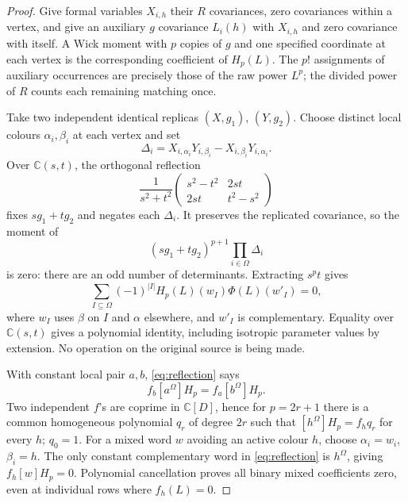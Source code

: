 \documentclass[11pt]{article}
\theoremstyle{definition}
\theoremstyle{plain}
\numberwithin{equation}{section}
\begin{document}
\begin{proof}
Give formal variables \(X_{i,h}\) their \(R\) covariances, zero covariances
within a vertex, and give an auxiliary \(g\) covariance \(L_i(h)\) with
\(X_{i,h}\) and zero covariance with itself. A Wick moment with \(p\) copies
of \(g\) and one specified coordinate at each vertex is the corresponding
coefficient of \(H_p(L)\). The \(p!\) assignments of auxiliary occurrences
are precisely those of the raw power \(L^p\); the divided power of \(R\)
counts each remaining matching once.

Take two independent identical replicas \((X,g_1)\), \((Y,g_2)\). Choose
distinct local colours \(\alpha_i,\beta_i\) at each vertex and set
\[
 \Delta_i=X_{i,\alpha_i}Y_{i,\beta_i}
              -X_{i,\beta_i}Y_{i,\alpha_i}.
\]
Over \(\mathbb C(s,t)\), the orthogonal reflection
\[
 \frac{1}{s^2+t^2}
 \begin{pmatrix}s^2-t^2&2st\\2st&t^2-s^2\end{pmatrix}
\]
fixes \(sg_1+tg_2\) and negates each \(\Delta_i\). It preserves the replicated
covariance, so the moment of
\[
 (sg_1+tg_2)^{p+1}\prod_{i\in\Omega}\Delta_i
\]
is zero: there are an odd number of determinants. Extracting \(s^pt\) gives
\begin{equation}
 \sum_{I\subseteq\Omega}(-1)^{|I|}H_p(L)(w_I)\Phi(L)(w'_I)=0,
 \tag{3}\label{eq:reflection}
\end{equation}
where \(w_I\) uses \(\beta\) on \(I\) and \(\alpha\) elsewhere, and \(w'_I\)
is complementary. Equality over \(\mathbb C(s,t)\) gives a polynomial identity,
including isotropic parameter values by extension. No operation on the
original source is being made.

With constant local pair \(a,b\), \eqref{eq:reflection} says
\[
 f_b[a^\Omega]H_p=f_a[b^\Omega]H_p.
\]
Two independent \(f\)'s are coprime in \(\mathbb C[D]\), hence for
\(p=2r+1\) there is a common homogeneous polynomial \(q_r\) of degree
\(2r\) such that \([h^\Omega]H_p=f_hq_r\) for every \(h\); \(q_0=1\).
For a mixed word \(w\) avoiding an active colour \(h\), choose
\(\alpha_i=w_i\), \(\beta_i=h\). The only constant complementary word in
\eqref{eq:reflection} is \(h^\Omega\), giving \(f_h[w]H_p=0\). Polynomial
cancellation proves all binary mixed coefficients zero, even at individual
rows where \(f_h(L)=0\).


\end{proof}
\end{document}
